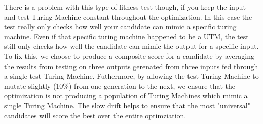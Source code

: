 There is a problem with this type of fitness test though, if you keep the input and test Turing Machine constant throughout the optimization. In this case the test really only checks how well your candidate can mimic a specific turing machine. Even if that specific turing machine happened to be a UTM, the test still only checks how well the candidate can mimic the output for a specific input. To fix this, we choose to produce a composite score for a candidate by averaging the results from testing on three outputs gerenated from three inputs fed through a single test Turing Machine. Futhermore, by allowing the test Turing Machine to mutate slightly (10\%) from one generation to the next, we ensure that the optimization is not producing a population of Turing Machines which mimic a single Turing Machine. The slow drift helps to ensure that the most "universal" candidates will score the best over the entire optimziation. 

